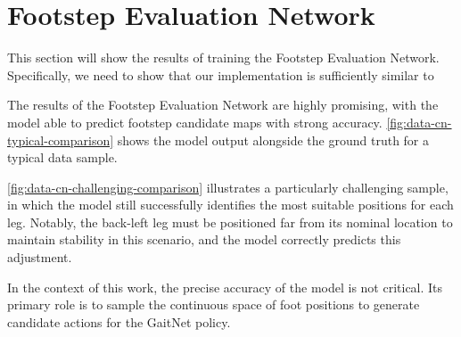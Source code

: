 \section{Footstep Evaluation Network}

\begin{todo}
  This section will show the results of training the
  Footstep Evaluation Network. Specifically, we need to show that
  our implementation is sufficiently similar to \cite{bratta_contactnet_2024}
\end{todo}

The results of the Footstep Evaluation Network are highly promising,
with the model able to predict footstep candidate maps with strong
accuracy. \autoref{fig:data-cn-typical-comparison} shows the model
output alongside the ground truth for a typical data sample.

\autoref{fig:data-cn-challenging-comparison} illustrates a
particularly challenging sample, in which the model still
successfully identifies the most suitable positions for each leg.
Notably, the back-left leg must be positioned far from its nominal
location to maintain stability in this scenario, and the model
correctly predicts this adjustment.

In the context of this work, the precise accuracy of the model is not
critical. Its primary role is to sample the continuous space of foot
positions to generate candidate actions for the GaitNet policy.

